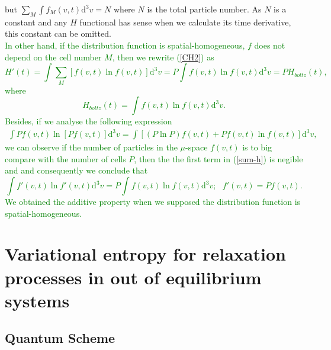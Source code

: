 \documentclass{article}
\begin{document}
  but $\sum_M \int f_M(v,t)\mathrm{d}^3v =N$ where $N$ is the total particle number. As $N$ is a constant and any $H$ functional has sense when we calculate its time derivative, this constant can be omitted. \\
  \textcolor{green}{In other hand, if the distribution function is spatial-homogeneous, $f$ does not depend on the cell number $M$, then we rewrite (\ref{CH2}) as
  \begin{equation}
      H'(t)=\int \sum_M [f(v,t)\ln f(v,t)] \mathrm{d}^{3}v = P\int  f(v,t) \ln f(v,t) \mathrm{d}^{3}v= P H_{boltz}(t), 
  \end{equation}
  where
  \begin{equation}
      H_{boltz}(t)=\int  f(v,t) \ln f(v,t) \mathrm{d}^{3}v.
  \end{equation}
  Besides, if we analyse the following expression
  \begin{eqnarray}
      \int Pf(v,t) \ln [Pf(v,t)] \mathrm{d}^{3}v = \int [(P\ln P)f(v,t) + Pf(v,t) \ln f(v,t)]\mathrm{d}^{3}v, \label{sum-h}
  \end{eqnarray}
  we can observe if the number of particles in the $\mu$-space $f(v,t)$ is to big compare with the number of cells $P$, then the the first term in (\ref{sum-h}) is negible and and consequently we conclude that
  \begin{equation}
      \int f'(v,t) \ln f'(v,t) \mathrm{d}^{3}v = P\int f(v,t) \ln f(v,t) \mathrm{d}^{3}v; \ \ \ f'(v,t)= Pf(v,t). \label{aditive-property} 
  \end{equation}
  We obtained the additive property when we supposed the distribution function is spatial-homogeneous.}
  
  
\section{Variational entropy for relaxation processes in out of equilibrium systems}


\subsection{Quantum Scheme}
\end{document}

